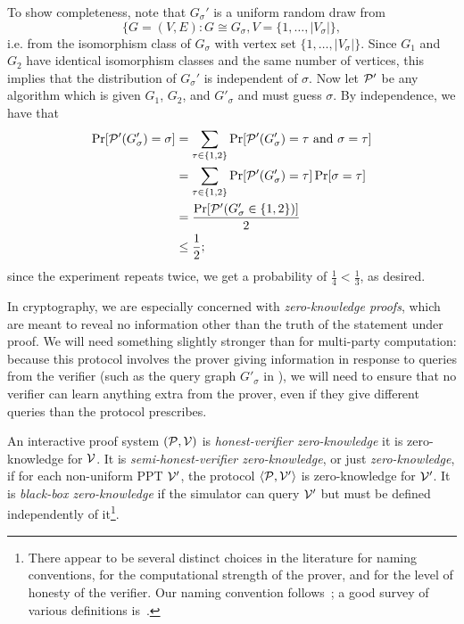 \begin{ex}
  To show completeness, note that $G_\sigma'$ is a uniform random draw from \[
    \{G = (V,E): G\cong G_\sigma, V = \{1,\dots,|V_\sigma|\},
  \]
  i.e. from the isomorphism class of $G_\sigma$ with vertex set
  $\{1,\dots,|V_\sigma|\}$. Since $G_1$ and $G_2$ have identical isomorphism
  classes and the same number of vertices, this implies that the distribution of
  $G_\sigma'$ is independent of $\sigma$. Now let $\mathcal{P}'$ be any algorithm which
  is given $G_1$, $G_2$, and $G'_\sigma$ and must guess $\sigma$. By
  independence, we have that
  \begin{align*}
    \Pr[\mathcal{P}'(G'_\sigma) = \sigma] &= \sum_{\tau\in\{1,2\}}\Pr[\mathcal{P}'(G'_\sigma) = \tau \text{ and } \sigma = \tau] \\
                                  &= \sum_{\tau\in\{1,2\}}\Pr[\mathcal{P}'(G'_\sigma) = \tau]\Pr[\sigma = \tau] \\
                                  &= \frac{\Pr[\mathcal{P}'(G'_\sigma\in\{1,2\})]}{2} \\
                                  &\leq \frac{1}{2};
  \end{align*}
  since the experiment repeats twice, we get a probability of
  $\frac{1}{4}<\frac{1}{3}$, as desired.
\end{ex}

In cryptography, we are especially concerned with \emph{zero-knowledge proofs},
which are meant to reveal no information other than the truth of the statement
under proof. We will need something slightly stronger than for multi-party
computation: because this protocol involves the prover giving information in
response to queries from the verifier (such as the query graph $G'_\sigma$ in
),
we will need to ensure that no verifier can learn anything extra from the
prover, even if they give different queries than the protocol prescribes.

\begin{dfn}\label{def:zkp}
  An interactive proof system $(\mathcal{P}, \mathcal{V})$ is \emph{honest-verifier
  zero-knowledge} it is zero-knowledge for $\mathcal{V}$. It is
  \emph{semi-honest-verifier zero-knowledge}, or just \emph{zero-knowledge}, if
  for each non-uniform PPT $\mathcal{V}'$, the protocol $\langle\mathcal{P}, \mathcal{V}'\rangle$ is
  zero-knowledge for $\mathcal{V}'$. It is \emph{black-box zero-knowledge} if the
  simulator can query $\mathcal{V}'$ but must be defined independently of
  it\footnote{There appear to be several distinct choices in the literature for
    naming conventions, for the computational strength of the prover, and for
  the level of honesty of the verifier. Our naming convention
follows~\cite{vadhan-2007}; a good survey of various definitions
is~\cite[Section 3]{goldreich-1994}.}.
\end{dfn}

